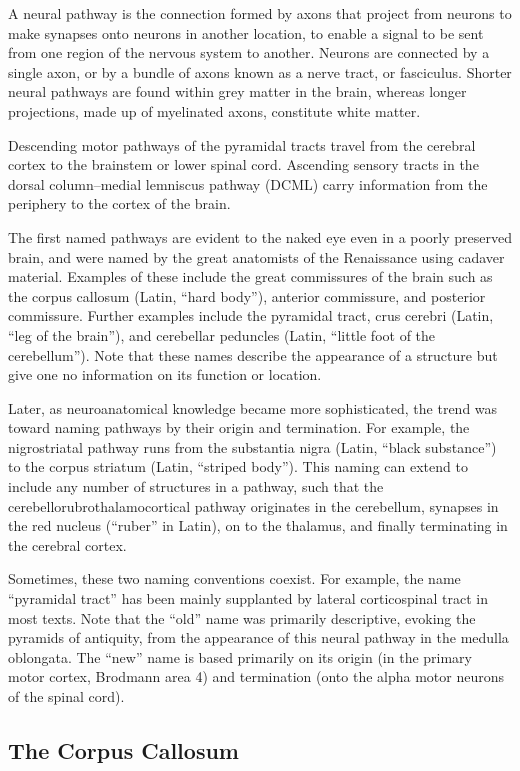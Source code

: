\documentclass[]{book}
\begin{document}
A neural pathway is the connection formed by axons that project from neurons to make synapses onto neurons in another location, to enable a signal to be sent from one region of the nervous system to another. Neurons are connected by a single axon, or by a bundle of axons known as a nerve tract, or fasciculus. Shorter neural pathways are found within grey matter in the brain, whereas longer projections, made up of myelinated axons, constitute white matter.

Descending motor pathways of the pyramidal tracts travel from the cerebral cortex to the brainstem or lower spinal cord. Ascending sensory tracts in the dorsal column--medial lemniscus pathway (DCML) carry information from the periphery to the cortex of the brain.

The first named pathways are evident to the naked eye even in a poorly preserved brain, and were named by the great anatomists of the Renaissance using cadaver material. Examples of these include the great commissures of the brain such as the corpus callosum (Latin, ``hard body''), anterior commissure, and posterior commissure. Further examples include the pyramidal tract, crus cerebri (Latin, ``leg of the brain''), and cerebellar peduncles (Latin, ``little foot of the cerebellum''). Note that these names describe the appearance of a structure but give one no information on its function or location.

Later, as neuroanatomical knowledge became more sophisticated, the trend was toward naming pathways by their origin and termination. For example, the nigrostriatal pathway runs from the substantia nigra (Latin, ``black substance'') to the corpus striatum (Latin, ``striped body''). This naming can extend to include any number of structures in a pathway, such that the cerebellorubrothalamocortical pathway originates in the cerebellum, synapses in the red nucleus (``ruber'' in Latin), on to the thalamus, and finally terminating in the cerebral cortex.

Sometimes, these two naming conventions coexist. For example, the name ``pyramidal tract'' has been mainly supplanted by lateral corticospinal tract in most texts. Note that the ``old'' name was primarily descriptive, evoking the pyramids of antiquity, from the appearance of this neural pathway in the medulla oblongata. The ``new'' name is based primarily on its origin (in the primary motor cortex, Brodmann area 4) and termination (onto the alpha motor neurons of the spinal cord).

\hypertarget{the-corpus-callosum}{%
\subsection{The Corpus Callosum}\label{the-corpus-callosum}}
\end{document}
